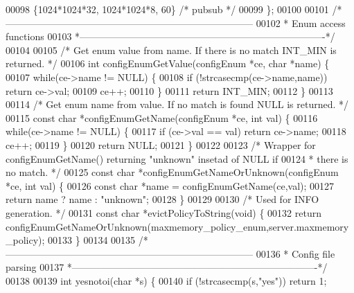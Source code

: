 \begin{DoxyCode}
00098     \{1024*1024*32, 1024*1024*8, 60\}  \textcolor{comment}{/* pubsub */}
00099 \};
00100 
00101 \textcolor{comment}{/*-----------------------------------------------------------------------------}
00102 \textcolor{comment}{ * Enum access functions}
00103 \textcolor{comment}{ *----------------------------------------------------------------------------*/}
00104 
00105 \textcolor{comment}{/* Get enum value from name. If there is no match INT\_MIN is returned. */}
00106 \textcolor{keywordtype}{int} configEnumGetValue(configEnum *ce, \textcolor{keywordtype}{char} *name) \{
00107     \textcolor{keywordflow}{while}(ce->name != NULL) \{
00108         \textcolor{keywordflow}{if} (!strcasecmp(ce->name,name)) \textcolor{keywordflow}{return} ce->val;
00109         ce++;
00110     \}
00111     \textcolor{keywordflow}{return} INT\_MIN;
00112 \}
00113 
00114 \textcolor{comment}{/* Get enum name from value. If no match is found NULL is returned. */}
00115 \textcolor{keyword}{const} \textcolor{keywordtype}{char} *configEnumGetName(configEnum *ce, \textcolor{keywordtype}{int} val) \{
00116     \textcolor{keywordflow}{while}(ce->name != NULL) \{
00117         \textcolor{keywordflow}{if} (ce->val == val) \textcolor{keywordflow}{return} ce->name;
00118         ce++;
00119     \}
00120     \textcolor{keywordflow}{return} NULL;
00121 \}
00122 
00123 \textcolor{comment}{/* Wrapper for configEnumGetName() returning "unknown" insetad of NULL if}
00124 \textcolor{comment}{ * there is no match. */}
00125 \textcolor{keyword}{const} \textcolor{keywordtype}{char} *configEnumGetNameOrUnknown(configEnum *ce, \textcolor{keywordtype}{int} val) \{
00126     \textcolor{keyword}{const} \textcolor{keywordtype}{char} *name = configEnumGetName(ce,val);
00127     \textcolor{keywordflow}{return} name ? name : \textcolor{stringliteral}{"unknown"};
00128 \}
00129 
00130 \textcolor{comment}{/* Used for INFO generation. */}
00131 \textcolor{keyword}{const} \textcolor{keywordtype}{char} *evictPolicyToString(\textcolor{keywordtype}{void}) \{
00132     \textcolor{keywordflow}{return} configEnumGetNameOrUnknown(maxmemory\_policy\_enum,server.maxmemory\_policy);
00133 \}
00134 
00135 \textcolor{comment}{/*-----------------------------------------------------------------------------}
00136 \textcolor{comment}{ * Config file parsing}
00137 \textcolor{comment}{ *----------------------------------------------------------------------------*/}
00138 
00139 \textcolor{keywordtype}{int} yesnotoi(\textcolor{keywordtype}{char} *s) \{
00140     \textcolor{keywordflow}{if} (!strcasecmp(s,\textcolor{stringliteral}{"yes"})) \textcolor{keywordflow}{return} 1;

\end{DoxyCode}
